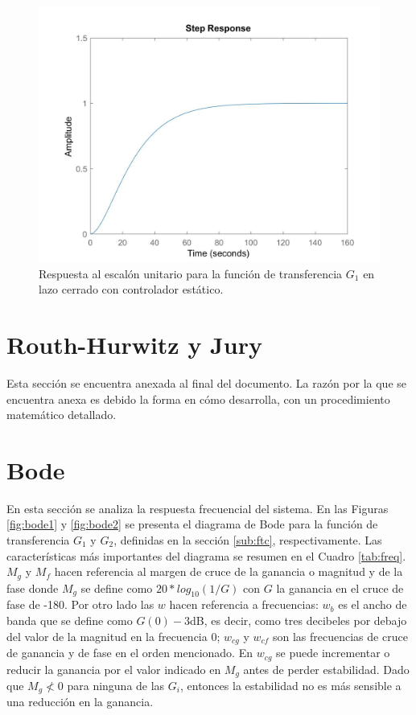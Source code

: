 \documentclass[journal]{IEEEtran}
\begin{document}
\begin{figure}[h!]
\caption{Respuesta al escalón unitario para la función de transferencia $G_1$ en lazo cerrado con controlador estático.\label{fig:stepGc1}}
  \centering
\includegraphics[scale=0.18]{control/step_Gc1.jpg}
\end{figure}
\vspace{20pt}
\section{Routh-Hurwitz y Jury}
Esta sección se encuentra anexada al final del documento. La razón por la que se encuentra anexa es debido la forma en cómo desarrolla,  con un procedimiento matemático detallado.

\section{Bode}

En esta sección se analiza la respuesta frecuencial del sistema. En las Figuras \ref{fig:bode1} y \ref{fig:bode2} se presenta el diagrama de Bode para la función de transferencia $G_1$ y $G_2$, definidas en la sección \ref{sub:ftc}, respectivamente. Las características más importantes del diagrama se resumen en el Cuadro \ref{tab:freq}. $M_g$ y $M_f$ hacen referencia al margen de cruce de la ganancia o magnitud y de la fase donde $M_g$ se define como $20*log_{10}(1/G)$ con $G$ la ganancia en el cruce de fase de -180. Por otro lado las $w$ hacen referencia a frecuencias: $w_b$ es el ancho de banda que se define como $G(0)-3$dB, es decir, como tres decibeles por debajo del valor de la magnitud en la frecuencia 0; $w_{cg}$ y $w_{cf}$ son las frecuencias de cruce de ganancia y de fase en el orden mencionado. En $w_{cg}$ se puede incrementar o reducir la ganancia por el valor indicado en $M_g$ antes de perder estabilidad. Dado que $M_g \not< 0$ para ninguna de las $G_i$, entonces la estabilidad no es más sensible a una reducción en la ganancia.\\
\end{document}
